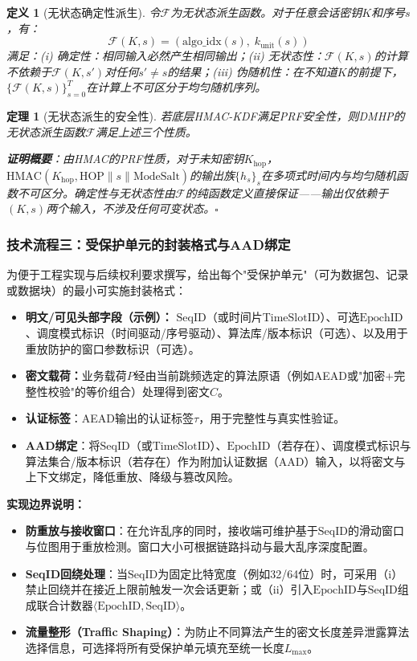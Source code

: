 ﻿\documentclass[12pt,a4paper]{article}
\newtheorem{theorem}{定理}
\newtheorem{definition}{定义}
\begin{document}
\begin{definition}[无状态确定性派生]
令$\mathcal{F}$为无状态派生函数。对于任意会话密钥$K$和序号$s$，有：
\[
\mathcal{F}(K, s) = (\text{algo\_idx}(s), \; k_{\text{unit}}(s))
\]
满足：(i) 确定性：相同输入必然产生相同输出；(ii) 无状态性：$\mathcal{F}(K, s)$的计算不依赖于$\mathcal{F}(K, s')$对任何$s' \neq s$的结果；(iii) 伪随机性：在不知道$K$的前提下，$\{\mathcal{F}(K, s)\}_{s=0}^{T}$在计算上不可区分于均匀随机序列。
\end{definition}

\begin{theorem}[无状态派生的安全性]
若底层HMAC-KDF满足PRF安全性，则DMHP的无状态派生函数$\mathcal{F}$满足上述三个性质。

\textbf{证明概要}：由HMAC的PRF性质，对于未知密钥$K_{\text{hop}}$，$\text{HMAC}(K_{\text{hop}}, \text{HOP} \| s \| \text{ModeSalt})$的输出族$\{h_s\}_{s}$在多项式时间内与均匀随机函数不可区分。确定性与无状态性由$\mathcal{F}$的纯函数定义直接保证——输出仅依赖于$(K, s)$两个输入，不涉及任何可变状态。$\square$
\end{theorem}

\subsubsection{技术流程三：受保护单元的封装格式与AAD绑定}

为便于工程实现与后续权利要求撰写，给出每个"受保护单元"（可为数据包、记录或数据块）的最小可实施封装格式：

\begin{itemize}
    \item \textbf{明文/可见头部字段（示例）：} $\text{SeqID}$（或时间片$\text{TimeSlotID}$）、可选$\text{EpochID}$、调度模式标识（时间驱动/序号驱动）、算法库/版本标识（可选）、以及用于重放防护的窗口参数标识（可选）。
    \item \textbf{密文载荷：}业务载荷$P$经由当前跳频选定的算法原语（例如AEAD或"加密+完整性校验"的等价组合）处理得到密文$C$。
    \item \textbf{认证标签}：AEAD输出的认证标签$\tau$，用于完整性与真实性验证。
    \item \textbf{AAD绑定}：将$\text{SeqID}$（或$\text{TimeSlotID}$）、$\text{EpochID}$（若存在）、调度模式标识与算法集合/版本标识（若存在）作为附加认证数据（AAD）输入，以将密文与上下文绑定，降低重放、降级与篡改风险。
\end{itemize}

\textbf{实现边界说明：}
\begin{itemize}
    \item \textbf{防重放与接收窗口}：在允许乱序的同时，接收端可维护基于$\text{SeqID}$的滑动窗口与位图用于重放检测。窗口大小可根据链路抖动与最大乱序深度配置。
    \item \textbf{SeqID回绕处理}：当$\text{SeqID}$为固定比特宽度（例如32/64位）时，可采用（i）禁止回绕并在接近上限前触发一次会话更新；或（ii）引入$\text{EpochID}$与$\text{SeqID}$组成联合计数器$\langle\text{EpochID},\text{SeqID}\rangle$。
    \item \textbf{流量整形（Traffic Shaping）}：为防止不同算法产生的密文长度差异泄露算法选择信息，可选择将所有受保护单元填充至统一长度$L_{\max}$。
\end{itemize}
\end{document}
